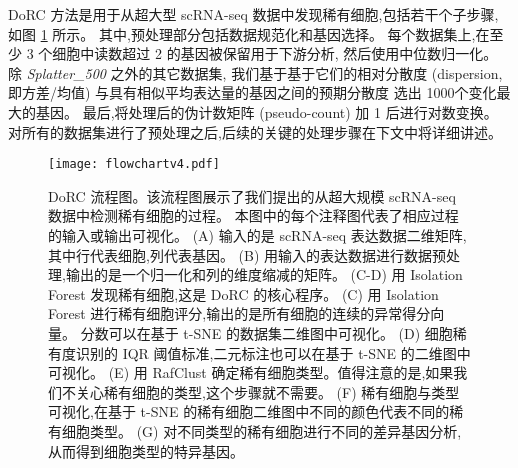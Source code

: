 DoRC 方法是用于从超大型 scRNA-seq 数据中发现稀有细胞,包括若干个子步骤,如图 \ref{fig:flowchart} 所示。
其中,预处理部分包括数据规范化和基因选择。
每个数据集上,在至少 3 个细胞中读数超过 2 的基因被保留用于下游分析,
然后使用中位数归一化。
除 \textit{Splatter\_500} 之外的其它数据集,
我们基于基于它们的相对分散度 (dispersion,即方差/均值) 与具有相似平均表达量的基因之间的预期分散度 \cite{zheng2017massively,macosko2015highly}选出 1000个变化最大的基因。
最后,将处理后的伪计数矩阵 (pseudo-count) 加 1 后进行对数变换。
对所有的数据集进行了预处理之后,后续的关键的处理步骤在下文中将详细讲述。

\begin{figure}[!htbp]
    \centering
    \texttt{[image: flowchartv4.pdf]}
    \caption{DoRC 流程图。该流程图展示了我们提出的从超大规模 scRNA-seq 数据中检测稀有细胞的过程。
    本图中的每个注释图代表了相应过程的输入或输出可视化。
    (A) 输入的是 scRNA-seq 表达数据二维矩阵,其中行代表细胞,列代表基因。
    (B) 用输入的表达数据进行数据预处理,输出的是一个归一化和列的维度缩减的矩阵。
    (C-D) 用 Isolation Forest 发现稀有细胞,这是 DoRC 的核心程序。
    (C) 用 Isolation Forest 进行稀有细胞评分,输出的是所有细胞的连续的异常得分向量。
    分数可以在基于 t-SNE 的数据集二维图中可视化。
    (D) 细胞稀有度识别的 IQR 阈值标准,二元标注也可以在基于 t-SNE 的二维图中可视化。
    (E) 用 RafClust 确定稀有细胞类型。值得注意的是,如果我们不关心稀有细胞的类型,这个步骤就不需要。
    (F) 稀有细胞与类型可视化,在基于 t-SNE 的稀有细胞二维图中不同的颜色代表不同的稀有细胞类型。
    (G) 对不同类型的稀有细胞进行不同的差异基因分析,从而得到细胞类型的特异基因。
    }
    \label{fig:flowchart}
\end{figure}

